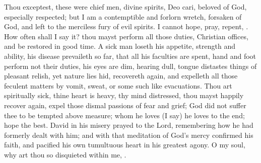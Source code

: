 {Thou exceptest, these were chief men, divine spirits, Deo cari, beloved
of God, especially respected; but I am a contemptible and forlorn
wretch, forsaken of God, and left to the merciless fury of evil
spirits. I cannot hope, pray, repent, \etc{}. How often shall I say it?
thou mayst perform all those duties, Christian offices, and be restored
in good time. A sick man loseth his appetite, strength and ability, his
disease prevaileth so far, that all his faculties are spent, hand and
foot perform not their duties, his eyes are dim, hearing dull, tongue
distastes things of pleasant relish, yet nature lies hid, recovereth
again, and expelleth all those feculent matters by vomit, sweat, or
some such like evacuations. Thou art spiritually sick, thine heart is
heavy, thy mind distressed, thou mayst happily recover again, expel
those dismal passions of fear and grief; God did not suffer thee to be
tempted above measure; whom he loves (I say) he loves to the end; hope
the best. David in his misery prayed to the Lord, remembering how he
had formerly dealt with him; and with that meditation of God's mercy
confirmed his faith, and pacified his own tumultuous heart in his
greatest agony. O my soul, why art thou so disquieted within me, \etc{}.

}
